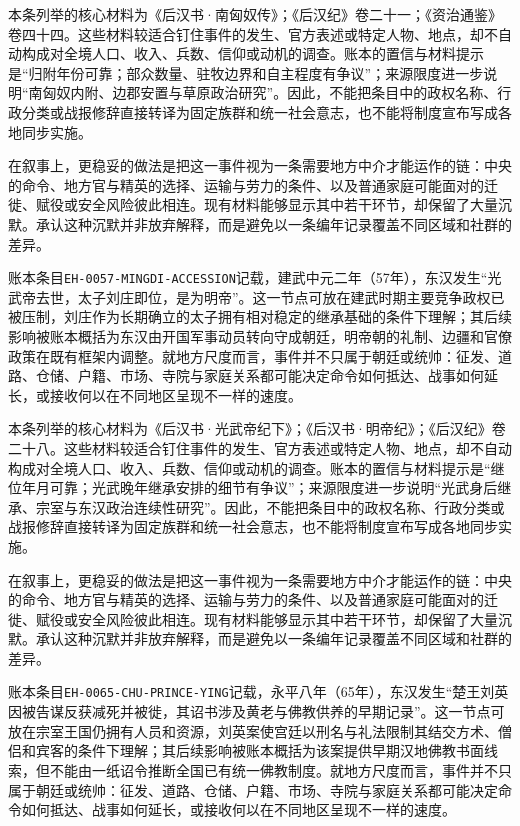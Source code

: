 本条列举的核心材料为《后汉书·南匈奴传》；《后汉纪》卷二十一；《资治通鉴》卷四十四。这些材料较适合钉住事件的发生、官方表述或特定人物、地点，却不自动构成对全境人口、收入、兵数、信仰或动机的调查。账本的置信与材料提示是“归附年份可靠；部众数量、驻牧边界和自主程度有争议”；来源限度进一步说明“南匈奴内附、边郡安置与草原政治研究”。因此，不能把条目中的政权名称、行政分类或战报修辞直接转译为固定族群和统一社会意志，也不能将制度宣布写成各地同步实施。

在叙事上，更稳妥的做法是把这一事件视为一条需要地方中介才能运作的链：中央的命令、地方官与精英的选择、运输与劳力的条件、以及普通家庭可能面对的迁徙、赋役或安全风险彼此相连。现有材料能够显示其中若干环节，却保留了大量沉默。承认这种沉默并非放弃解释，而是避免以一条编年记录覆盖不同区域和社群的差异。

账本条目\texttt{EH-0057-MINGDI-ACCESSION}记载，建武中元二年（57年），东汉发生“光武帝去世，太子刘庄即位，是为明帝”。这一节点可放在建武时期主要竞争政权已被压制，刘庄作为长期确立的太子拥有相对稳定的继承基础的条件下理解；其后续影响被账本概括为东汉由开国军事动员转向守成朝廷，明帝朝的礼制、边疆和官僚政策在既有框架内调整。就地方尺度而言，事件并不只属于朝廷或统帅：征发、道路、仓储、户籍、市场、寺院与家庭关系都可能决定命令如何抵达、战事如何延长，或接收何以在不同地区呈现不一样的速度。

本条列举的核心材料为《后汉书·光武帝纪下》；《后汉书·明帝纪》；《后汉纪》卷二十八。这些材料较适合钉住事件的发生、官方表述或特定人物、地点，却不自动构成对全境人口、收入、兵数、信仰或动机的调查。账本的置信与材料提示是“继位年月可靠；光武晚年继承安排的细节有争议”；来源限度进一步说明“光武身后继承、宗室与东汉政治连续性研究”。因此，不能把条目中的政权名称、行政分类或战报修辞直接转译为固定族群和统一社会意志，也不能将制度宣布写成各地同步实施。

在叙事上，更稳妥的做法是把这一事件视为一条需要地方中介才能运作的链：中央的命令、地方官与精英的选择、运输与劳力的条件、以及普通家庭可能面对的迁徙、赋役或安全风险彼此相连。现有材料能够显示其中若干环节，却保留了大量沉默。承认这种沉默并非放弃解释，而是避免以一条编年记录覆盖不同区域和社群的差异。

账本条目\texttt{EH-0065-CHU-PRINCE-YING}记载，永平八年（65年），东汉发生“楚王刘英因被告谋反获减死并被徙，其诏书涉及黄老与佛教供养的早期记录”。这一节点可放在宗室王国仍拥有人员和资源，刘英案使宫廷以刑名与礼法限制其结交方术、僧侣和宾客的条件下理解；其后续影响被账本概括为该案提供早期汉地佛教书面线索，但不能由一纸诏令推断全国已有统一佛教制度。就地方尺度而言，事件并不只属于朝廷或统帅：征发、道路、仓储、户籍、市场、寺院与家庭关系都可能决定命令如何抵达、战事如何延长，或接收何以在不同地区呈现不一样的速度。

